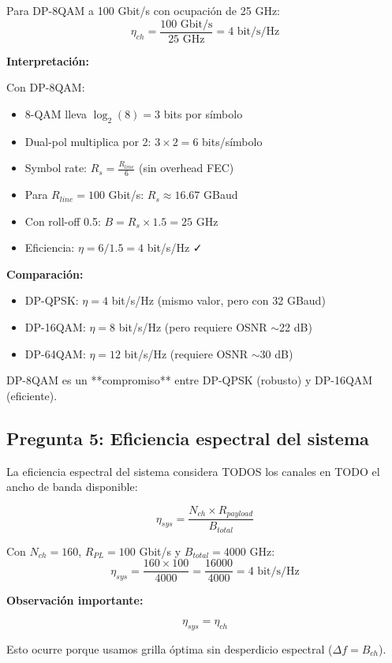 \documentclass[a4paper,10pt]{article}
\begin{document}
Para DP-8QAM a 100 Gbit/s con ocupación de 25 GHz:
$$\eta_{ch} = \frac{100 \text{ Gbit/s}}{25 \text{ GHz}} = \boxed{4 \text{ bit/s/Hz}}$$

\textbf{Interpretación:}

Con DP-8QAM:
\begin{itemize}
    \item 8-QAM lleva $\log_2(8) = 3$ bits por símbolo
    \item Dual-pol multiplica por 2: $3 \times 2 = 6$ bits/símbolo
    \item Symbol rate: $R_s = \frac{R_{line}}{6}$ (sin overhead FEC)
    \item Para $R_{line} = 100$ Gbit/s: $R_s \approx 16.67$ GBaud
    \item Con roll-off 0.5: $B = R_s \times 1.5 = 25$ GHz
    \item Eficiencia: $\eta = 6 / 1.5 = 4$ bit/s/Hz ✓
\end{itemize}

\textbf{Comparación:}
\begin{itemize}
    \item DP-QPSK: $\eta = 4$ bit/s/Hz (mismo valor, pero con 32 GBaud)
    \item DP-16QAM: $\eta = 8$ bit/s/Hz (pero requiere OSNR $\sim$22 dB)
    \item DP-64QAM: $\eta = 12$ bit/s/Hz (requiere OSNR $\sim$30 dB)
\end{itemize}

DP-8QAM es un **compromiso** entre DP-QPSK (robusto) y DP-16QAM (eficiente).

\subsection{Pregunta 5: Eficiencia espectral del sistema}

La eficiencia espectral del sistema considera TODOS los canales en TODO el ancho de banda disponible:

$$\eta_{sys} = \frac{N_{ch} \times R_{payload}}{B_{total}}$$

Con $N_{ch} = 160$, $R_{PL} = 100$ Gbit/s y $B_{total} = 4000$ GHz:
$$\eta_{sys} = \frac{160 \times 100}{4000} = \frac{16000}{4000} = \boxed{4 \text{ bit/s/Hz}}$$

\textbf{Observación importante:}

$$\eta_{sys} = \eta_{ch}$$

Esto ocurre porque usamos grilla óptima sin desperdicio espectral ($\Delta f = B_{ch}$).
\end{document}
